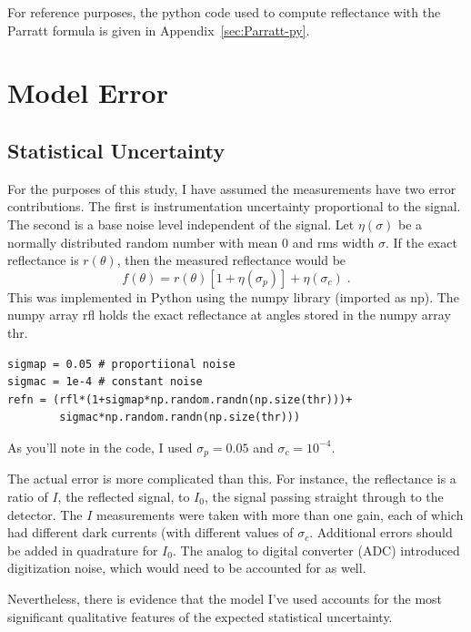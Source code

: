 \documentclass[english]{scrartcl}
\begin{document}
For reference purposes, the python code used to compute reflectance
with the Parratt formula is given in Appendix~\ref{sec:Parratt-py}.

\section{Model Error}
\subsection{Statistical Uncertainty}
For the purposes of this study, I have assumed the measurements have
two error contributions. The first is instrumentation uncertainty
proportional to the signal. The second is a base noise level independent
of the signal. Let $\eta(\sigma)$ be a normally distributed random number
with mean $0$ and rms width $\sigma$. If the exact reflectance is
$r(\theta)$, then the measured reflectance would be
\begin{equation}
f(\theta)=r(\theta)[1+\eta(\sigma_p)]+\eta(\sigma_c)\;.
\end{equation}
This was implemented in Python using the numpy library (imported as np).
The numpy array rfl holds the exact reflectance at angles stored in
the numpy array thr.
\begin{lstlisting}
sigmap = 0.05 # proportiional noise
sigmac = 1e-4 # constant noise
refn = (rfl*(1+sigmap*np.random.randn(np.size(thr)))+
        sigmac*np.random.randn(np.size(thr)))
\end{lstlisting}
As you'll note in the code, I used $\sigma_p=0.05$ and $\sigma_c=10^{-4}$.

The actual error is more complicated than this. For instance, the
reflectance is a ratio of $I$, the reflected signal, to $I_0$, the signal
passing straight through to the detector. The $I$ measurements were taken
with more than one gain, each of which had different dark currents (with
different values of $\sigma_c$. Additional errors should be added in
quadrature for $I_0$. The analog to digital converter (ADC) introduced
digitization noise, which would need to be accounted for as well.

Nevertheless, there is evidence that the model I've used accounts for
the most significant qualitative features of the expected statistical
uncertainty.
\end{document}
